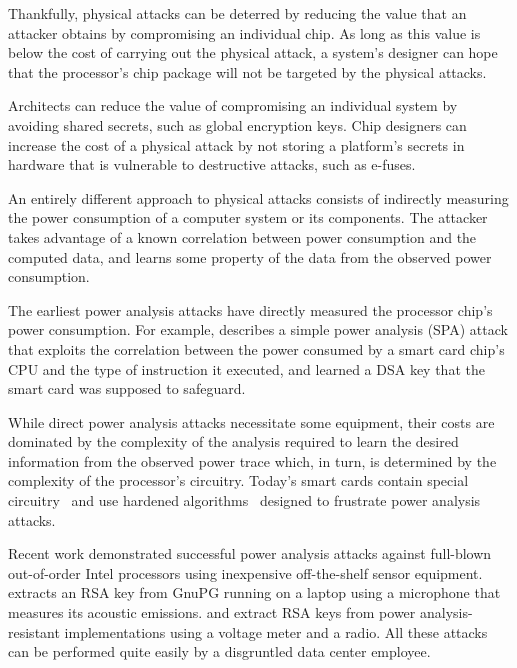 Thankfully, physical attacks can be deterred by reducing the value that an
attacker obtains by compromising an individual chip. As long as this value is
below the cost of carrying out the physical attack, a system's designer can
hope that the processor's chip package will not be targeted by the physical
attacks.

Architects can reduce the value of compromising an individual system by
avoiding shared secrets, such as global encryption keys. Chip designers can
increase the cost of a physical attack by not storing a platform's secrets in
hardware that is vulnerable to destructive attacks, such as e-fuses.


\label{sec:power_analysis_attacks}

An entirely different approach to physical attacks consists of indirectly
measuring the power consumption of a computer system or its components. The
attacker takes advantage of a known correlation between power consumption and
the computed data, and learns some property of the data from the observed power
consumption.

The earliest power analysis attacks have directly measured the processor chip's
power consumption. For example, \cite{kocher1999dpa} describes a simple power
analysis (SPA) attack that exploits the correlation between the power consumed
by a smart card chip's CPU and the type of instruction it executed, and learned
a DSA key that the smart card was supposed to safeguard.

While direct power analysis attacks necessitate some equipment, their costs are
dominated by the complexity of the analysis required to learn the desired
information from the observed power trace which, in turn, is determined by the
complexity of the processor's circuitry. Today's smart cards contain special
circuitry~\cite{tiri2002dcmos} and use hardened algorithms~\cite{herbst2006aes}
designed to frustrate power analysis attacks.

Recent work demonstrated successful power analysis attacks against full-blown
out-of-order Intel processors using inexpensive off-the-shelf sensor equipment.
\cite{genkin2014rsa} extracts an RSA key from GnuPG running on a laptop using a
microphone that measures its acoustic emissions. \cite{genkin2014fullpa} and
\cite{genkin2015radiopa} extract RSA keys from power analysis-resistant
implementations using a voltage meter and a radio. All these attacks can be
performed quite easily by a disgruntled data center employee.

